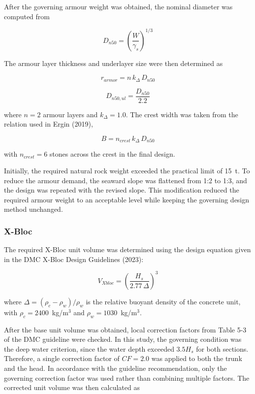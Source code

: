 \documentclass[a4paper, 11pt]{article}
\begin{document}
After the governing armour weight was obtained, the nominal diameter was computed from

\begin{equation}
    D_{n50}=\left(\frac{W}{\gamma_s}\right)^{1/3}
\end{equation}

The armour layer thickness and underlayer size were then determined as

\begin{equation}
    r_{armor}=n\,k_{\Delta}\,D_{n50}
\end{equation}

\begin{equation}
    D_{n50,ul}=\frac{D_{n50}}{2.2}
\end{equation}

where $n=2$ armour layers and $k_{\Delta}=1.0$. The crest width was taken from the relation used in Ergin (2019),

\begin{equation}
    B=n_{crest}\,k_{\Delta}\,D_{n50}
\end{equation}

with $n_{crest}=6$ stones across the crest in the final design.

Initially, the required natural rock weight exceeded the practical limit of 15~t. To reduce the armour demand, the seaward slope was flattened from 1:2 to 1:3, and the design was repeated with the revised slope. This modification reduced the required armour weight to an acceptable level while keeping the governing design method unchanged.

\subsubsection{X-Bloc}
\hspace{0.5cm}The required X-Bloc unit volume was determined using the design equation given in the DMC X-Bloc Design Guidelines (2023):

\begin{equation}
    V_{Xbloc}=\left(\frac{H_s}{2.77\,\Delta}\right)^3
\end{equation}

where $\Delta=(\rho_c-\rho_w)/\rho_w$ is the relative buoyant density of the concrete unit, with $\rho_c=2400$~kg/m$^3$ and $\rho_w=1030$~kg/m$^3$.

After the base unit volume was obtained, local correction factors from Table 5-3 of the DMC guideline were checked. In this study, the governing condition was the deep water criterion, since the water depth exceeded $3.5H_s$ for both sections. Therefore, a single correction factor of $CF=2.0$ was applied to both the trunk and the head. In accordance with the guideline recommendation, only the governing correction factor was used rather than combining multiple factors. The corrected unit volume was then calculated as
\end{document}
